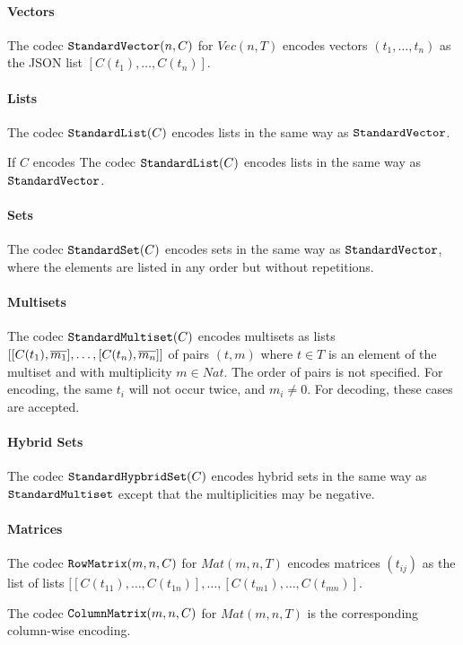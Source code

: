 \paragraph{Vectors}
The codec $\cn{StandardVector}(n,C)$ for $Vec(n,T)$ encodes vectors $(t_1,\ldots,t_n)$ as the JSON list $[C(t_1),\ldots,C(t_n)]$.

\paragraph{Lists}
The codec $\cn{StandardList}(C)$ encodes lists in the same way as $\cn{StandardVector}$.

If $C$ encodes 
The codec $\cn{StandardList}(C)$ encodes lists in the same way as $\cn{StandardVector}$.


\paragraph{Sets}
The codec $\cn{StandardSet}(C)$ encodes sets in the same way as $\cn{StandardVector}$, where the elements are listed in any order but without repetitions.

\paragraph{Multisets}
The codec $\cn{StandardMultiset}(C)$ encodes multisets as lists $[[C(t_1),\ov{m_1}], \ldots, [C(t_n),\ov{m_n}]]$ of pairs $(t,m)$ where $t\in T$ is an element of the multiset and with multiplicity $m\in Nat$.
The order of pairs is not specified.
For encoding, the same $t_i$ will not occur twice, and $m_i\neq 0$. For decoding, these cases are accepted.

\paragraph{Hybrid Sets}
The codec $\cn{StandardHypbridSet}(C)$ encodes hybrid sets in the same way as $\cn{StandardMultiset}$ except that the multiplicities may be negative.

\paragraph{Matrices}
The codec $\cn{RowMatrix}(m,n,C)$ for $Mat(m,n,T)$ encodes matrices $(t_{ij})$ as the list of lists $[[C(t_{11}),\ldots,C(t_{1n})], \ldots, [C(t_{m1}),\ldots,C(t_{mn})]$.

The codec $\cn{ColumnMatrix}(m,n,C)$ for $Mat(m,n,T)$ is the corresponding column-wise encoding.

